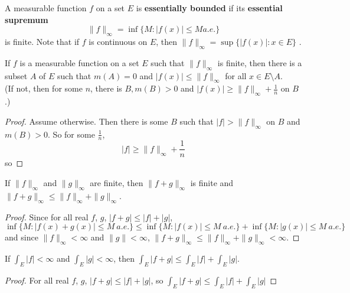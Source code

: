 \begin{defn}%
	A measurable function $f$ on a set $E$ is \textbf{essentially bounded} if its 
	\textbf{essential supremum} 
	\begin{equation*}
		\|f\|_\infty = \inf\{M: |f(x)| \le M a.e.\}
	\end{equation*}
	is finite. Note that if $f$ is continuous on $E$, then $\|f\|_\infty=\sup\{|f(x)|:x\in E\}$ . 
\end{defn}

\begin{pblm}%
	If $f$ is a measurable function on a set $E$ such that $\|f\|_\infty$ is finite, then 
	there is a subset $A$ of $E$ such that $m(A) = 0$ and $|f(x)| \le \|f\|_\infty$ for all 
	$x \in E\setminus A$. \\
	{\scriptsize{(If not, then for some $n$, there is $B, m(B) > 0$ and $|f(x)|\ge\|f\|_\infty + \frac{1}{n}$ 
	on $B$.)}}
\begin{proof}
	Assume otherwise. Then there is some $B$ such that $|f| > \|f\|_\infty$ on $B$ and 
	$m(B) > 0$. So for some $\frac{1}{n}$, 
	\begin{equation*}
		|f| \ge \|f\|_\infty + \frac{1}{n}
	\end{equation*}
	so 
\end{proof}
\end{pblm}

\begin{pblm}%
	If $\|f\|_\infty$ and $\|g\|_\infty$ are finite, then $\|f+g\|_\infty$ is finite and 
	$\|f+g\|_\infty \le \|f\|_\infty+\|g\|_\infty$. 
\begin{proof}
	Since for all real $f$, $g$, $|f + g| \le |f|+|g|$, 
	\begin{equation*}
		\inf\{M: |f(x) + g(x)| \le M ~ a.e.\} \le \inf\{M:|f(x)| \le M ~ a.e.\} + \inf\{M: |g(x)| \le M ~ a.e.\} 
	\end{equation*}
	and since $\|f\|_\infty < \infty$ and $\|g\| < \infty$, $\|f + g\|_\infty \le \|f\|_\infty + \|g\|_\infty < \infty$. 
\end{proof}
\end{pblm}

\begin{pblm}%
	If $\int_E|f|<\infty$ and $\int_E|g|<\infty$, then $\int_E|f+g|\le\int_E|f|+\int_E|g|$. 
\begin{proof}
	For all real $f$, $g$,  $|f + g| \le |f| + |g|$, so $\int_E|f + g|\le \int_E|f| + \int_E|g|$
\end{proof}
\end{pblm}

